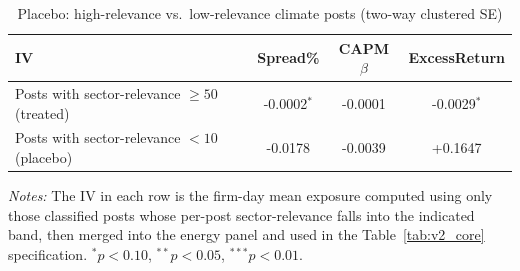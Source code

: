 \begin{table}[htbp]
\centering
\caption{Placebo: high-relevance vs.\ low-relevance climate posts (two-way clustered SE)}
\label{tab:v2_placebo}
\begin{threeparttable}
\begin{tabular}{l c c c}
\toprule
IV & Spread\% & CAPM $\beta$ & ExcessReturn \\
\midrule
Posts with sector-relevance $\geq 50$ (treated) & -0.0002$^{*}$ & -0.0001 & -0.0029$^{*}$ \\
Posts with sector-relevance $<10$ (placebo) & -0.0178 & -0.0039 & +0.1647 \\
\bottomrule
\end{tabular}
\begin{tablenotes}\small
\item \textit{Notes:} The IV in each row is the firm-day mean exposure computed using only those
classified posts whose per-post sector-relevance falls into the indicated band, then merged into the
energy panel and used in the Table~\ref{tab:v2_core} specification.
$^{*}p<0.10$, $^{**}p<0.05$, $^{***}p<0.01$.
\end{tablenotes}
\end{threeparttable}
\end{table}